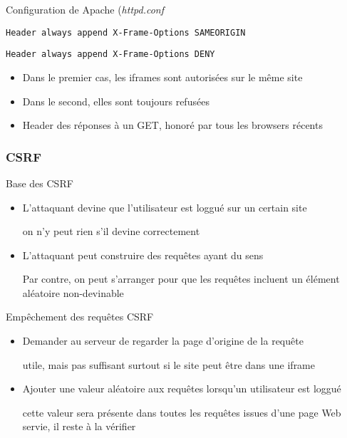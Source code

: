 \begin{reveals}
\begin{frame}
  \pause
  \begin{block}{Configuration de Apache (\emph{httpd.conf}}
\begin{trivlist}
\item \tt Header always append X-Frame-Options SAMEORIGIN
\item \tt Header always append X-Frame-Options DENY
\end{trivlist}
    \begin{itemize}
    \item Dans le premier cas, les iframes sont autoris{\'e}es sur le m{\^e}me
      site
    \item Dans le second, elles sont toujours refus{\'e}es
    \item Header des r{\'e}ponses {\`a} un GET, honor{\'e} par tous
      les browsers r{\'e}cents
    \end{itemize}
  \end{block}
\end{frame}

\begin{frame}
  \frametitle{CSRF}

  \begin{block}{Base des CSRF}
    \begin{itemize}
    \item L'attaquant devine que l'utilisateur est loggu{\'e} sur un
      certain site
      \begin{center}
        on n'y peut rien s'il devine correctement
      \end{center}
    \item L'attaquant peut construire des requ{\^e}tes ayant du sens
      \begin{center}
        Par contre, on peut s'arranger pour que les requ{\^e}tes incluent
        un {\'e}l{\'e}ment al{\'e}atoire non-devinable
      \end{center}
    \end{itemize}
  \end{block}

  \pause

  \begin{block}{Emp{\^e}chement des requ{\^e}tes CSRF}
    \begin{itemize}
    \item Demander au serveur de regarder la page d'origine de la
      requ{\^e}te
      \begin{center}
        utile, mais pas suffisant surtout si le site peut {\^e}tre dans
        une iframe
      \end{center}
    \item Ajouter une valeur al{\'e}atoire aux requêtes lorsqu'un utilisateur
      est loggu{\'e}
      \begin{center}
        cette valeur sera pr\'esente dans toutes les requ\^etes issues d'une
      page Web servie, il reste \`a la v\'erifier
      \end{center}
    \end{itemize}
  \end{block}
\end{frame}


\end{reveals}
